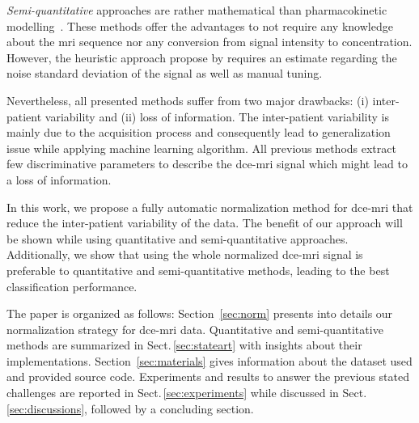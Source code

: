 \emph{Semi-quantitative} approaches are rather mathematical than pharmacokinetic modelling~\citep{huisman2001accurate,gliozzi2011phenomenological}.
These methods offer the advantages to not require any knowledge about the \ac{mri} sequence nor any conversion from signal intensity to concentration.
However, the heuristic approach propose by \citeauthor{huisman2001accurate} requires an estimate regarding the noise standard deviation of the signal as well as manual tuning.

Nevertheless, all presented methods suffer from two major drawbacks:
(i) inter-patient variability and (ii) loss of information.
The inter-patient variability is mainly due to the acquisition process and consequently lead to generalization issue while applying machine learning algorithm.
All previous methods extract few discriminative parameters to describe the \ac{dce}-\ac{mri} signal which might lead to a loss of information.

In this work, we propose a fully automatic normalization method for \ac{dce}-\ac{mri} that reduce the inter-patient variability of the data.
The benefit of our approach will be shown while using quantitative and semi-quantitative approaches.
Additionally, we show that using the whole normalized \ac{dce}-\ac{mri} signal is preferable to quantitative and semi-quantitative methods, leading to the best classification performance.

{\color{red}
The paper is organized as follows:
Section~\ref{sec:norm} presents into details our normalization strategy for \ac{dce}-\ac{mri} data.
Quantitative and semi-quantitative methods are summarized in Sect.\,\ref{sec:stateart} with insights about their implementations.
Section~\ref{sec:materials} gives information about the dataset used and provided source code.
Experiments and results to answer the previous stated challenges are reported in Sect.\,\ref{sec:experiments} while discussed in Sect.\,\ref{sec:discussions}, followed by a concluding section.
}

